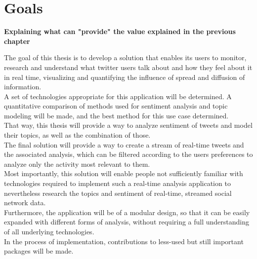 \chapter{Goals}
\label{ch:goals}

\textbf{Explaining what can "provide" the value explained in the previous chapter}


The goal of this thesis is to develop a solution that enables its users to monitor,
research and understand what twitter users talk about and how they feel about it in real time,
visualizing and quantifying the influence of spread and diffusion of information.
\\
A set of technologies appropriate for this application will be determined.
A quantitative comparison of methods used for sentiment analysis and topic modeling will be made,
and the best method for this use case determined.
\\
That way, this thesis will provide a way to analyze sentiment of tweets and model their topics,
as well as the combination of those.
\\
The final solution will provide a way to create a stream of real-time tweets and the associated analysis,
which can be filtered according to the users preferences to analyze only the activity most relevant to them.
\\
Most importantly, this solution will enable people not sufficiently familiar with technologies required to
implement such a real-time analysis application to nevertheless research the topics and sentiment of real-time,
streamed social network data.
\\
Furthermore, the application will be  of a modular design, so that it can be easily expanded with different forms of analysis,
without requiring a full understanding of all underlying technologies.
\\
In the process of implementation,
contributions to less-used but still important packages will be made.
